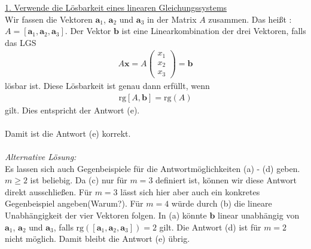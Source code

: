 \underline{1. Verwende die Lösbarkeit eines linearen Gleichungssystems}\\
Wir fassen die Vektoren $ \textbf{a}_1 $, $ \textbf{a}_2 $ und $ \textbf{a}_3 $ in der Matrix $ A $ zusammen. 
Das heißt : $ A = [\textbf{a}_1,\textbf{a}_2,\textbf{a}_3] $.
Der Vektor $ \textbf{b} $ ist eine Linearkombination der drei Vektoren, falls das LGS
\begin{align*}
	A \textbf{x} = 
	A \begin{pmatrix}
		x_1\\ x_2 \\ x_3
	\end{pmatrix}
	= \textbf{b}
\end{align*}
lösbar ist.
Diese Lösbarkeit ist genau dann erfüllt, wenn 
\begin{align*}
	\mathrm{rg}
	[A, \textbf{b}]
	=
	\mathrm{rg}(A)
\end{align*}
gilt. Dies entspricht der Antwort (e).\\
\\
Damit ist die Antwort (e) korrekt.\\
\\
\textit{Alternative Lösung:}\\
Es lassen sich auch Gegenbeispiele für die Antwortmöglichkeiten (a) - (d) geben.
$ m \geq 2 $ ist beliebig. Da (c) nur für $ m = 3 $ definiert ist, können wir diese Antwort direkt ausschließen.
Für $ m = 3 $ lässt sich hier aber auch ein konkretes Gegenbeispiel angeben(Warum?).
Für $ m = 4 $ würde durch (b)  die lineare Unabhängigkeit der vier Vektoren folgen.
In (a) könnte $ \textbf{b} $ linear unabhängig von $ \textbf{a}_1 $, $ \textbf{a}_2  $ und $ \textbf{a}_3 $, falls $ \mathrm{rg}\left([ \textbf{a}_1, \textbf{a}_2 , \textbf{a}_3]  \right) = 2 $ gilt.
Die Antwort (d) ist für $ m=2 $ nicht möglich.
Damit bleibt die Antwort (e) übrig.

\newpage
